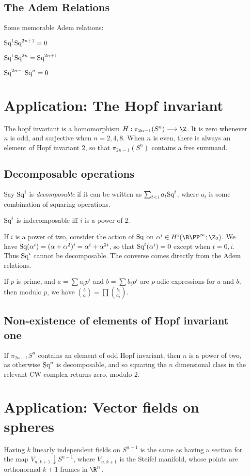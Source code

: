 \documentclass[11pt]{article}
\begin{document}
{\subsection{The Adem Relations}
Some memorable Adem relations:
\begin{itemise}
\item $\textup{Sq}^1\textup{Sq}^{2n+1}=0$
\item $\textup{Sq}^1\textup{Sq}^{2n}=\textup{Sq}^{2n+1}$
\item $\textup{Sq}^{2n-1}\textup{Sq}^{n}=0$
\end{itemise}
\section{Application: The Hopf invariant}
The hopf invariant is a homomorphism $H:\pi_{2n-1}(S^n)\to\Z$. It is zero whenever $n$ is odd, and surjective when $n=2,4,8$. When $n$ is even, there is always an element of Hopf invariant $2$, so that $\pi_{2n-1}(S^n)$ contains a free summand.
\setcounter{subsection}{1}
\subsection{Decomposable operations}
Say $\textup{Sq}^i$ is \emph{decomposable} if it can be written as $\sum_{t<i}a_t\textup{Sq}^t$, where $a_t$ is some combination of squaring operations.
\begin{thm*}
$\textup{Sq}^i$ is indecomposable iff $i$ is a power of $2$.
\end{thm*}
If $i$ is a power of two, consider the action of $\textup{Sq}$ on $\alpha^i\in H^i(\RP^\infty;\Z_2)$. We have $\textup{Sq}(\alpha^i)=(\alpha+\alpha^2)^i=\alpha^i+\alpha^{2i}$, so that $\textup{Sq}^t(\alpha^i)=0$ except when $t=0,i$. Thus $\textup{Sq}^i$ cannot be decomposable. The converse comes directly from the Adem relations.
\begin{lem*}
If $p$ is prime, and $a=\sum a_ip^i$ and $b=\sum b_ip^i$ are $p$-adic expressions for $a$ and $b$, then modulo $p$, we have $\binom{b}{a}=\prod\binom{b_i}{a_i}$.
\end{lem*}
\subsection{Non-existence of elements of Hopf invariant one}
If $\pi_{2n-1}S^n$ contains an element of odd Hopf invariant, then $n$ is a power of two, as otherwise $\textup{Sq}^n$ is decomposable, and so squaring the $n$ dimensional class in the relevant CW complex returns zero, modulo 2.

\section{Application: Vector fields on spheres}
Having $k$ linearly independent fields on $S^{n-1}$ is the same as having a section for the map $V_{n,k+1}\downarrow S^{n-1}$, where $V_{n,k+1}$ is the Steifel manifold, whose points are orthonormal $k+1$-frames in $\R^n$. 

}
\end{document}
